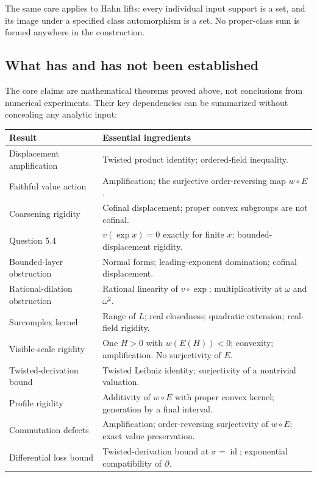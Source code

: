 \documentclass[11pt]{article}
\theoremstyle{definition}
\theoremstyle{remark}
\newcommand{\id}{\operatorname{id}}
\numberwithin{equation}{section}
\begin{document}
The same care applies to Hahn lifts: every individual input support is a
set, and its image under a specified class automorphism is a set. No
proper-class sum is formed anywhere in the construction.

\subsection{What has and has not been established}

The core claims are mathematical theorems proved above, not conclusions
from numerical experiments. Their key dependencies can be summarized
without concealing any analytic input:
\begin{center}
\small
\begin{tabular}{@{}p{}p{}@{}}
\toprule
Result & Essential ingredients\\
\midrule
Displacement amplification & Twisted product identity; ordered-field inequality.\\
Faithful value action & Amplification; the surjective order-reversing map $w\circ E$.\\
Coarsening rigidity & Cofinal displacement; proper convex subgroups are not cofinal.\\
Question 5.4 & $v(\exp x)=0$ exactly for finite $x$; bounded-displacement rigidity.\\
Bounded-layer obstruction & Normal forms; leading-exponent domination; cofinal displacement.\\
Rational-dilation obstruction & Rational linearity of $v\circ\exp$; multiplicativity at $\omega$ and $\omega^2$.\\
Surcomplex kernel & Range of $L$; real closedness; quadratic extension; real-field rigidity.\\
Visible-scale rigidity & One $H>0$ with $w(E(H))<0$; convexity; amplification. No surjectivity of $E$.\\
Twisted-derivation bound & Twisted Leibniz identity; surjectivity of a nontrivial valuation.\\
Profile rigidity & Additivity of $w\circ E$ with proper convex kernel; generation by a final interval.\\
Commutation defects & Amplification; order-reversing surjectivity of $w\circ E$; exact value preservation.\\
Differential loss bound & Twisted-derivation bound at $\sigma=\id$; exponential compatibility of $\partial$.\\
\bottomrule
\end{tabular}
\end{center}
\end{document}
